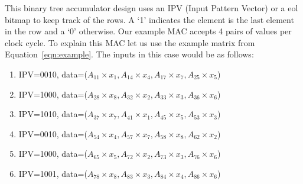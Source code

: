 \par This binary tree accumulator design uses an IPV (Input Pattern Vector) or a eol bitmap to keep track of the rows. A `1' indicates the element is the last element in the row and a `0' otherwise. Our example MAC accepts 4 pairs of values per clock cycle. To explain this MAC let us use the example matrix from Equation~\ref{eqn:example}. The inputs in this case would be as follows:
\begin{enumerate}
    \item IPV=0010, data=($A_{11}\times x_1, A_{14}\times x_4, A_{17}\times x_7, A_{25}\times x_5$)
    \item IPV=1000, data=($A_{28}\times x_8, A_{32}\times x_2, A_{33}\times x_3, A_{36}\times x_6$)
    \item IPV=1010, data=($A_{37}\times x_7, A_{41}\times x_1, A_{45}\times x_5, A_{53}\times x_3$)
    \item IPV=0010, data=($A_{54}\times x_4, A_{57}\times x_7, A_{58}\times x_8, A_{62}\times x_2$)
    \item IPV=1000, data=($A_{65}\times x_5, A_{72}\times x_2, A_{73}\times x_3, A_{76}\times x_6$)
    \item IPV=1001, data=($A_{78}\times x_8, A_{83}\times x_3, A_{84}\times x_4, A_{86}\times x_6$)
\end{enumerate}
